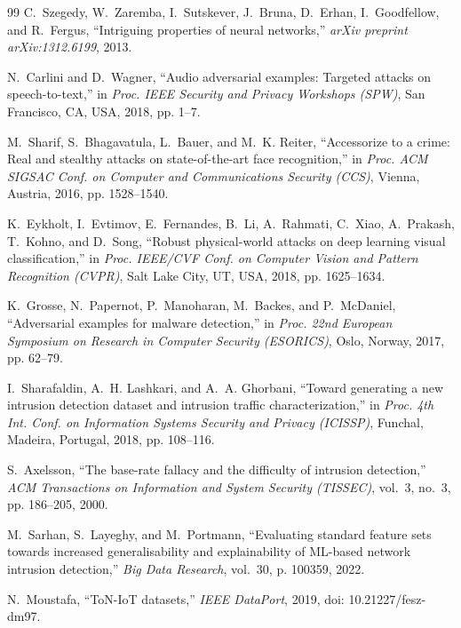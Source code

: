 \documentclass[conference]{IEEEtran}
\begin{document}
\begin{thebibliography}{99}
C.~Szegedy, W.~Zaremba, I.~Sutskever, J.~Bruna, D.~Erhan, I.~Goodfellow, and R.~Fergus, ``Intriguing properties of neural networks,'' \emph{arXiv preprint arXiv:1312.6199}, 2013.

N.~Carlini and D.~Wagner, ``Audio adversarial examples: Targeted attacks on speech-to-text,'' in \emph{Proc. IEEE Security and Privacy Workshops (SPW)}, San Francisco, CA, USA, 2018, pp. 1--7.

M.~Sharif, S.~Bhagavatula, L.~Bauer, and M.~K. Reiter, ``Accessorize to a crime: Real and stealthy attacks on state-of-the-art face recognition,'' in \emph{Proc. ACM SIGSAC Conf. on Computer and Communications Security (CCS)}, Vienna, Austria, 2016, pp. 1528--1540.

K.~Eykholt, I.~Evtimov, E.~Fernandes, B.~Li, A.~Rahmati, C.~Xiao, A.~Prakash, T.~Kohno, and D.~Song, ``Robust physical-world attacks on deep learning visual classification,'' in \emph{Proc. IEEE/CVF Conf. on Computer Vision and Pattern Recognition (CVPR)}, Salt Lake City, UT, USA, 2018, pp. 1625--1634.

K.~Grosse, N.~Papernot, P.~Manoharan, M.~Backes, and P.~McDaniel, ``Adversarial examples for malware detection,'' in \emph{Proc. 22nd European Symposium on Research in Computer Security (ESORICS)}, Oslo, Norway, 2017, pp. 62--79.

I.~Sharafaldin, A.~H. Lashkari, and A.~A. Ghorbani, ``Toward generating a new intrusion detection dataset and intrusion traffic characterization,'' in \emph{Proc. 4th Int. Conf. on Information Systems Security and Privacy (ICISSP)}, Funchal, Madeira, Portugal, 2018, pp. 108--116.

S.~Axelsson, ``The base-rate fallacy and the difficulty of intrusion detection,'' \emph{ACM Transactions on Information and System Security (TISSEC)}, vol.~3, no.~3, pp. 186--205, 2000.

M.~Sarhan, S.~Layeghy, and M.~Portmann, ``Evaluating standard feature sets towards increased generalisability and explainability of ML-based network intrusion detection,'' \emph{Big Data Research}, vol.~30, p. 100359, 2022.

N.~Moustafa, ``ToN-IoT datasets,'' \emph{IEEE DataPort}, 2019, doi: 10.21227/fesz-dm97.

\end{thebibliography}
\end{document}
